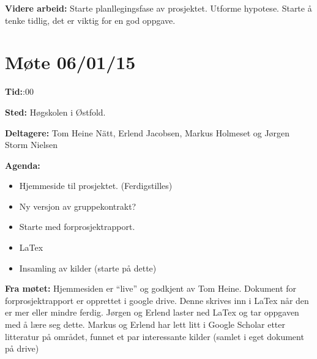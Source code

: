 \vspace{20pt}

\hspace{-17pt}\textbf{Videre arbeid:}\newline
Starte planllegingsfase av prosjektet.\newline
Utforme hypotese.\newline
Starte å tenke tidlig, det er viktig for en god oppgave.\newline







\newpage


\section{Møte 06/01/15}

\vspace{30pt}
\textbf{Tid:}:00\newline 

\hspace{-17pt}\textbf{Sted:}\newline 
Høgskolen i Østfold.\newline

\hspace{-17pt}\textbf{Deltagere:}\newline 
Tom Heine Nätt, Erlend Jacobsen, Markus Holmeset og Jørgen Storm Nielsen\newline

\hspace{-17pt}\textbf{Agenda:}

\begin{itemize}
\item Hjemmeside til prosjektet. (Ferdigstilles)
\item Ny versjon av gruppekontrakt?
\item Starte med forprosjektrapport.
\item LaTex
\item Insamling av kilder (starte på dette)

\end{itemize}


\hspace{-17pt}\textbf{Fra møtet:}\newline
Hjemmesiden er “live” og godkjent av Tom Heine.\newline
Dokument for forprosjektrapport er opprettet i google drive. Denne skrives inn i LaTex når den er mer eller mindre ferdig. Jørgen og Erlend laster ned LaTex og tar oppgaven med å lære seg dette. Markus og Erlend har lett litt i Google Scholar etter litteratur på området, funnet et par interessante kilder (samlet i eget dokument på drive)\newline


